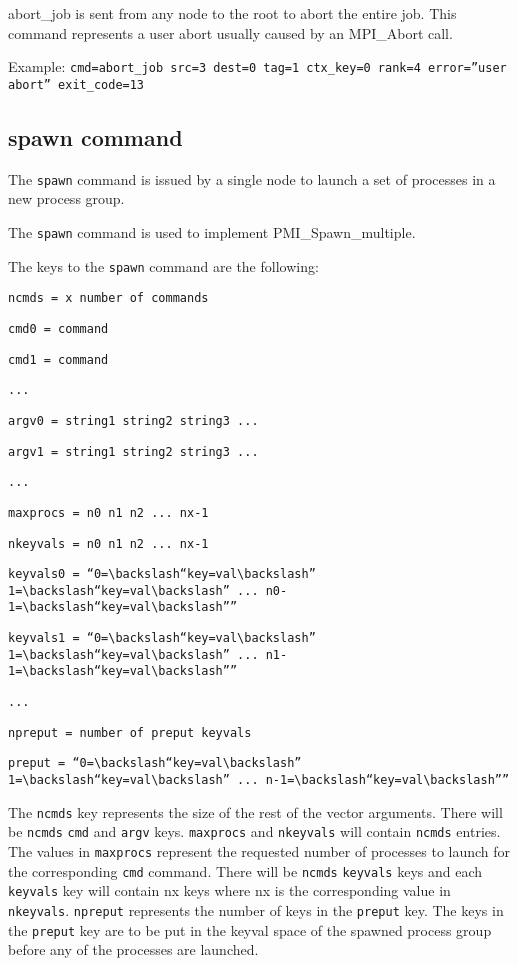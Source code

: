 \documentclass[dvipdfm,11pt]{article}
\begin{document}
\begin{description}
abort\_job is sent from any node to the root to abort the entire job.  This
command represents a user abort usually caused by an MPI\_Abort call.

Example: \texttt{cmd=abort\_job src=3 dest=0 tag=1 ctx\_key=0 rank=4 error=''user abort'' exit\_code=13}
\end{description}

\subsection{spawn command}
The \texttt{spawn} command is issued by a single node to launch a set of 
processes in a new process group.

The \texttt{spawn} command is used to implement PMI\_Spawn\_multiple.

The keys to the \texttt{spawn} command are the following:
\begin{description}
\item \texttt{ncmds = x number of commands}
\item \texttt{cmd0 = command}
\item \texttt{cmd1 = command}
\item \texttt{...}
\item \texttt{argv0 = string1 string2 string3 ...}
\item \texttt{argv1 = string1 string2 string3 ...}
\item \texttt{...}
\item \texttt{maxprocs = n0 n1 n2 ... nx-1}
\item \texttt{nkeyvals = n0 n1 n2 ... nx-1}
\item \texttt{keyvals0 = ``0=$\backslash$``key=val$\backslash$'' 
1=$\backslash$``key=val$\backslash$'' ... 
n0-1=$\backslash$``key=val$\backslash$''''}
\item \texttt{keyvals1 = ``0=$\backslash$``key=val$\backslash$'' 
1=$\backslash$``key=val$\backslash$'' ... 
n1-1=$\backslash$``key=val$\backslash$''''}
\item \texttt{...}
\item \texttt{npreput = number of preput keyvals}
\item \texttt{preput = ``0=$\backslash$``key=val$\backslash$'' 
1=$\backslash$``key=val$\backslash$'' ... 
n-1=$\backslash$``key=val$\backslash$''''}
\end{description}

The \texttt{ncmds} key represents the size of the rest of the vector arguments.
There will be \texttt{ncmds} \texttt{cmd} and \texttt{argv} keys.  \texttt{maxprocs}
and \texttt{nkeyvals} will contain \texttt{ncmds} entries.  The values in
\texttt{maxprocs} represent the requested number of processes to launch for the
corresponding \texttt{cmd} command.  There will be \texttt{ncmds} \texttt{keyvals}
keys and each \texttt{keyvals} key will contain nx keys where nx is the 
corresponding value in \texttt{nkeyvals}.  \texttt{npreput} represents the 
number of keys in the \texttt{preput} key.  The keys in the \texttt{preput} key
are to be put in the keyval space of the spawned process group before any
of the processes are launched.
\end{document}
